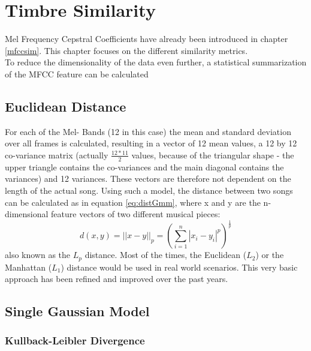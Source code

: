 \chapter{Timbre Similarity} \label{musly}

Mel Frequency Cepstral Coefficients have already been introduced in chapter \ref{mfccsim}. This chapter focuses on the different similarity metrics.\\
To reduce the dimensionality of the data even further, a statistical summarization of the MFCC feature can be calculated \cite[pp. 51ff]{knees1}\\


\section{Euclidean Distance}

For each of the Mel- Bands (12 in this case) the mean and standard deviation over all frames is calculated, resulting in a vector of 12 mean values, a 12 by 12 co-variance matrix (actually $\frac{12*11}{2}$ values, because of the triangular shape - the upper triangle contains the co-variances and the main diagonal contains the variances) and 12 variances. These vectors are therefore not dependent on the length of the actual song. 
Using such a model, the distance between two songs can be calculated as in equation \ref{eq:distGmm}, where x and y are the n-dimensional feature vectors of two different musical pieces:
\begin{equation} \label{eq:distGmm}
d(x, y) = ||x - y||_p = \left(\sum_{i=1}^{n}{|x_i - y_i|^p}\right)^{\frac{1}{p}}
\end{equation}
also known as the $L_p$ distance. Most of the times, the Euclidean ($L_2$) or the Manhattan ($L_1$) distance would be used in real world scenarios.
This very basic approach has been refined and improved over the past years. 

\section{Single Gaussian Model}

\subsection{Kullback-Leibler Divergence}

